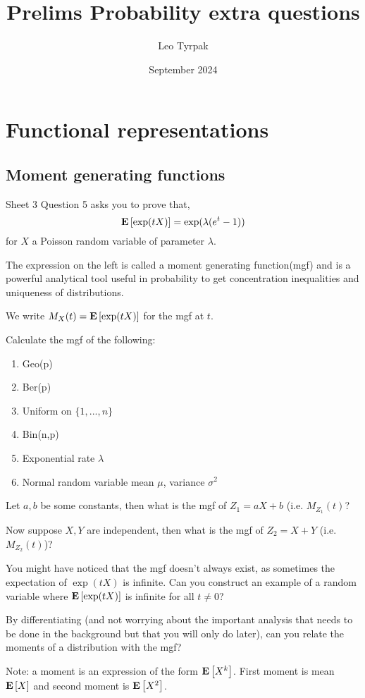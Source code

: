\documentclass{article}
\title{Prelims Probability extra questions}
\author{Leo Tyrpak}
\date{September 2024}
\begin{document}
\maketitle

\section{Functional representations}
\subsection{Moment generating functions}
Sheet 3 Question 5 asks you to prove that,
\begin{equation*}
    {\mathbf E}\left[\exp(t X)\right]=\exp(\lambda(e^t-1))
\end{equation*}
for $X$ a Poisson random variable of parameter $\lambda$.

The expression on the left is called a moment generating function(mgf) and is a powerful analytical tool useful in probability to get concentration inequalities and uniqueness of distributions.

We write $M_X(t)={\mathbf E}\left[\exp(tX)\right]$ for the mgf at $t$.

Calculate the mgf of the following:
\begin{enumerate}
    \item Geo(p)
    \item Ber(p)
    \item Uniform on $\{1,...,n\}$
    \item Bin(n,p)
    \item Exponential rate $\lambda$
    \item Normal random variable mean $\mu$, variance $\sigma^2$
\end{enumerate}
Let $a,b$ be some constants, then what is the mgf of $Z_1=aX+b$ (i.e. $M_{Z_1}(t)$?

Now suppose $X,Y$ are independent, then what is the mgf of $Z_2=X+Y$ (i.e. $M_{Z_2}(t)$)?

You might have noticed that the mgf doesn't always exist, as sometimes the expectation of $\exp(tX)$ is infinite. 
Can you construct an example of a random variable where ${\mathbf E}\left[\exp(tX)\right]$ is infinite for all $t\neq0$?

By differentiating (and not worrying about the important analysis that needs to be done in the background but that you will only do later), can you relate the moments of a distribution with the mgf?

Note: a moment is an expression of the form ${\mathbf E}\left[X^k\right]$.
First moment is mean ${\mathbf E}\left[X\right]$ and second moment is ${\mathbf E}\left[X^2\right]$.
\end{document}
